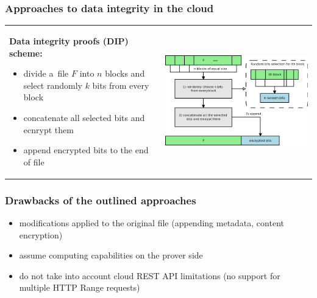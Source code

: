\documentclass[9pt]{beamer}
\begin{document}
\begin{frame}
\frametitle{\hspace{5mm} \textbf{Approaches to data integrity in the cloud}}
\begin{block}{}
\begin{tabular}{l l}
	\begin{minipage}{0.4\textwidth}
	\textbf{Data integrity proofs (DIP) scheme:}
	\begin{itemize}
		\item divide a~file $F$ into $n$ blocks and select randomly $k$ bits from every block
		\item concatenate all selected bits and ecnrypt them
		\item append encrypted bits to the end of file
	\end{itemize}
	\end{minipage}
	&
	\begin{minipage}{0.6\textwidth}
		\includegraphics[width=0.5\paperwidth]{img/dip-schematic.png}
	\end{minipage}
\end{tabular}
\end{block}
\end{frame}


\begin{frame}
\frametitle{\hspace{5mm} \textbf{Drawbacks of the outlined approaches}}
\begin{block}{}
	\begin{itemize}
		\item modifications applied to the original file (appending metadata, content encryption)
		\item assume computing capabilities on the prover side
		\item do not take into account cloud REST API limitations (no support for multiple HTTP Range requests)
	\end{itemize}
\end{block}
\end{frame}
\end{document}
